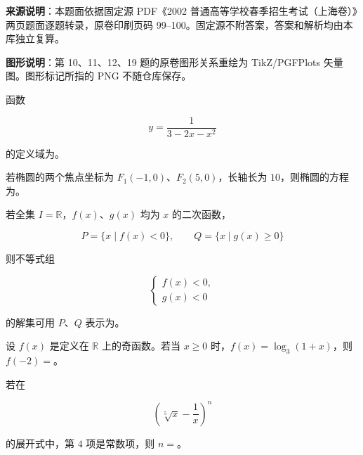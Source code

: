


\begin{gktip}
\textbf{来源说明}：本题面依据固定源 PDF《2002 普通高等学校春季招生考试（上海卷）》两页题面逐题转录，原卷印刷页码 99–100。固定源不附答案，答案和解析均由本库独立复算。

\textbf{图形说明}：第 10、11、12、19 题的原卷图形关系重绘为 TikZ/PGFPlots 矢量图。图形标记所指的 PNG 不随仓库保存。
\end{gktip}


\begin{question}
函数

\nopagebreak[4]
\[
y=\frac1{3-2x-x^2}
\]

的定义域为\gkblank{}。

\end{question}
\begin{question}
若椭圆的两个焦点坐标为 $F_1(-1,0)$、$F_2(5,0)$，长轴长为 $10$，则椭圆的方程为\gkblank{}。

\end{question}
\begin{question}
若全集 $I=\mathbb R$，$f(x)\text{、}g(x)$ 均为 $x$ 的二次函数，

\nopagebreak[4]
\[
P=\{x\mid f(x)<0\},\qquad Q=\{x\mid g(x)\ge0\}
\]

则不等式组

\nopagebreak[4]
\[
\begin{cases}
f(x)<0,\\
g(x)<0
\end{cases}
\]

的解集可用 $P\text{、}Q$ 表示为\gkblank{}。

\end{question}
\begin{question}
设 $f(x)$ 是定义在 $\mathbb R$ 上的奇函数。若当 $x\ge0$ 时，$f(x)=\log_3(1+x)$，则 $f(-2)=$\gkblank{}。

\end{question}
\begin{question}
若在

\nopagebreak[4]
\[
\left(\sqrt[5]{x}-\frac1x\right)^n
\]

的展开式中，第 $4$ 项是常数项，则 $n=$\gkblank{}。

\end{question}
